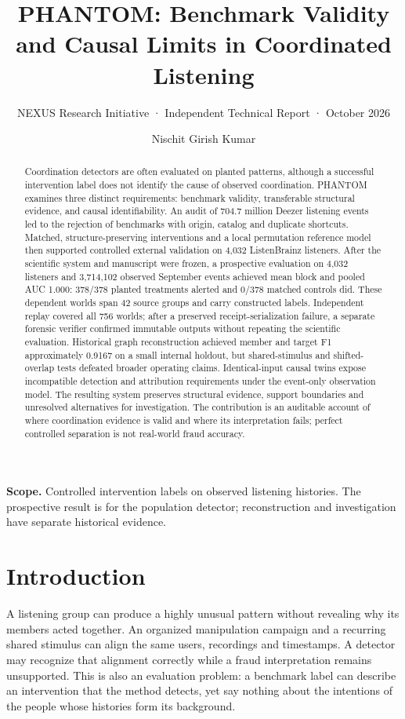 \documentclass[sigconf,nonacm]{acmart}
\title[PHANTOM: Benchmark Validity and Causal Limits]{PHANTOM: Benchmark Validity and Causal Limits in Coordinated Listening}
\subtitle{NEXUS Research Initiative · Independent Technical Report · October 2026}
\author{Nischit Girish Kumar}
\affiliation{\institution{NEXUS Research Initiative --- Independent Research}\country{}}
\begin{document}
\begin{abstract}
Coordination detectors are often evaluated on planted patterns, although a successful intervention label does not identify the cause of observed coordination. PHANTOM examines three distinct requirements: benchmark validity, transferable structural evidence, and causal identifiability. An audit of 704.7 million Deezer listening events led to the rejection of benchmarks with origin, catalog and duplicate shortcuts. Matched, structure-preserving interventions and a local permutation reference model then supported controlled external validation on 4,032 ListenBrainz listeners. After the scientific system and manuscript were frozen, a prospective evaluation on 4,032 listeners and 3,714,102 observed September events achieved mean block and pooled AUC 1.000: 378/378 planted treatments alerted and 0/378 matched controls did. These dependent worlds span 42 source groups and carry constructed labels. Independent replay covered all 756 worlds; after a preserved receipt-serialization failure, a separate forensic verifier confirmed immutable outputs without repeating the scientific evaluation. Historical graph reconstruction achieved member and target F1 approximately 0.9167 on a small internal holdout, but shared-stimulus and shifted-overlap tests defeated broader operating claims. Identical-input causal twins expose incompatible detection and attribution requirements under the event-only observation model. The resulting system preserves structural evidence, support boundaries and unresolved alternatives for investigation. The contribution is an auditable account of where coordination evidence is valid and where its interpretation fails; perfect controlled separation is not real-world fraud accuracy.
\end{abstract}
\maketitle
{}
\noindent\textbf{Scope.} Controlled intervention labels on observed listening histories. The prospective result is for the population detector; reconstruction and investigation have separate historical evidence.

\section{Introduction}
A listening group can produce a highly unusual pattern without revealing why its members acted together. An organized manipulation campaign and a recurring shared stimulus can align the same users, recordings and timestamps. A detector may recognize that alignment correctly while a fraud interpretation remains unsupported. This is also an evaluation problem: a benchmark label can describe an intervention that the method detects, yet say nothing about the intentions of the people whose histories form its background.
\end{document}
